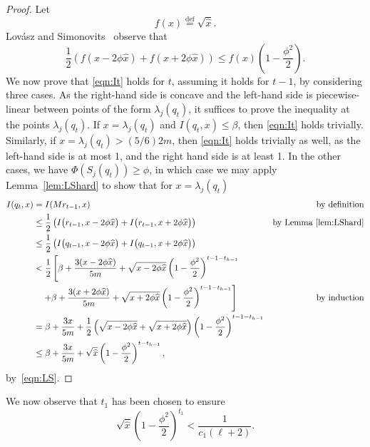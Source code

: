 \documentclass[11pt]{article}
\newcommand{\setj}[2]{S_{#1} (#2)}
\newcommand{\lamj}[2]{\lambda_{#1} (#2)}
\def\defeq{\stackrel{\mathrm{def}}{=}}
\begin{document}
\begin{proof}
Let
\[
f (x) \defeq \sqrt{\widehat{x}}.
\]
Lov\'asz and Simonovits~\cite{LovaszSimonovitsFOCS} observe that
\begin{equation}\label{eqn:LS}
\frac{1}{2}
\left(
f (x - 2 \phi \widehat{x}) +
f (x + 2 \phi \widehat{x})
 \right)
\leq
f (x) \left(1 - \frac{\phi^{2}}{2} \right).
\end{equation}
We now prove that \eqref{eqn:It} holds for $t$, assuming it holds for $t-1$,
  by considering three cases.
As the right-hand side is concave and the left-hand side is piecewise-linear
  between points of the form $\lamj{j}{q_{t}}$,
  it suffices to prove the inequality at the points
  $\lamj{j}{q_{t}}$.
If $x = \lamj{j}{q_{t}}$ and 
  $I (q_{t}, x) \leq \beta$, then \eqref{eqn:It} holds trivially.
Similarly, if $x = \lamj{j}{q_{t}} > (5/6) 2m $,
  then \eqref{eqn:It} holds trivially as well, as
  the left-hand side is at most 1, and the right hand side is at least 1.
In the other cases, we have $\Phi (\setj{j}{q_{t}}) \geq \phi$,
  in which case we may apply Lemma~\ref{lem:LShard} to show
  that for $x = \lamj{j}{q_{t}}$
\begin{align*}
  I (q_{t}, x)
& = 
  I (M r_{t-1}, x) & \text{by definition}
\\
& \leq 
\frac{1}{2}
\left(
I \big(r_{t-1}, x - 2 \phi \widehat{x}\big)
 +
I \big(r_{t-1}, x + 2 \phi \widehat{x} \big)
 \right) 
& \text{by Lemma~\ref{lem:LShard}}
\\
& \leq 
\frac{1}{2}
\left(
I \big(q_{t-1}, x - 2 \phi \widehat{x}\big)
 +
I \big(q_{t-1}, x + 2 \phi \widehat{x} \big)
 \right) 
\\
& <
\frac{1}{2}
\left[
\beta + \frac{3 (x - 2 \phi \widehat{x})}{5m}
+
\sqrt{x - 2 \phi \widehat{x}} \left(1 - \frac{\phi^{2}}{2} \right)^{t-1-t_{h-1}}
\right.
\\
& \quad \left. + 
\beta + \frac{3 (x + 2 \phi \widehat{x})}{5m}
+
\sqrt{x + 2 \phi \widehat{x}} \left(1 - \frac{\phi^{2}}{2} \right)^{t-1-t_{h-1}}
\right]
& \text{by induction}
\\
& =
\beta + \frac{3 x}{5 m}
+
\frac{1}{2}
\left(
\sqrt{x - 2 \phi \widehat{x}}
+
\sqrt{x + 2 \phi \widehat{x}}
\right)
 \left(1 - \frac{\phi^{2}}{2} \right)^{t-1-t_{h-1}}
\\
& \leq 
\beta + \frac{3 x}{5 m}
+
\sqrt{\widehat{x}}
 \left(1 - \frac{\phi^{2}}{2} \right)^{t-t_{h-1}},
\end{align*}
by~\eqref{eqn:LS}.
\end{proof}

We now observe that $t_{1}$ has been chosen to ensure
\begin{equation}\label{eqn:tEnsure}
  \sqrt{\widehat{x}} \left(1 - \frac{\phi^{2}}{2} \right)^{t_{1}}
<
  \frac{1}{c_{1} (\ell +2)}.
\end{equation}
\end{document}
